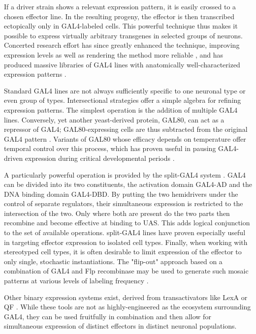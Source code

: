 If a driver strain shows a relevant expression pattern, it is easily crossed to a chosen effector line. In the resulting progeny, the effector is then transcribed ectopically only in GAL4-labeled cells. This powerful technique thus makes it possible to express virtually arbitrary transgenes in selected groups of neurons. Concerted research effort has since greatly enhanced the technique, improving expression levels as well as rendering the method more reliable \citep{Pfeiffer:2010aa,Pfeiffer:2012bu}, and has produced massive libraries of GAL4 lines with anatomically well-characterized expression patterns \citep{Pfeiffer:2008aa,Jenett:2012aa,Kvon:2014aa}.

Standard GAL4 lines are not always sufficiently specific to one neuronal type or even group of types. Intersectional strategies offer a simple algebra for refining expression patterns. The simplest operation is the addition of multiple GAL4 lines. Conversely, yet another yeast-derived protein, GAL80, can act as a repressor of GAL4; GAL80-expressing cells are thus subtracted from the original GAL4 pattern \citep{Lee:1999aa}. Variants of GAL80 whose efficacy depends on temperature offer temporal control over this process, which has proven useful in pausing GAL4-driven expression during critical developmental periods \citep{McGuire:2003aa}.

A particularly powerful operation is provided by the split-GAL4 system \citep{Luan:2006aa}. GAL4 can be divided into its two constituents, the activation domain GAL4-AD and the DNA binding domain GAL4-DBD. By putting the two hemidrivers under the control of separate regulators, their simultaneous expression is restricted to the intersection of the two. Only where both are present do the two parts then recombine and become effective at binding to UAS. This adds logical conjunction to the set of available operations. split-GAL4 lines have proven especially useful in targeting effector expression to isolated cell types. Finally, when working with stereotyped cell types, it is often desirable to limit expression of the effector to only single, stochastic instantiations. The "flip-out" approach based on a combination of GAL4 and Flp recombinase may be used to generate such mosaic patterns at various levels of labeling frequency \citep{Golic:1989aa,Struhl:1993aa,Bohm:2010aa}.

Other binary expression systems exist, derived from transactivators like LexA \citep{Lai:2006aa} or QF \citep{Potter:2010aa}. While these tools are not as highly-engineered as the ecosystem surrounding GAL4, they can be used fruitfully in combination and then allow for simultaneous expression of distinct effectors in distinct neuronal populations.

